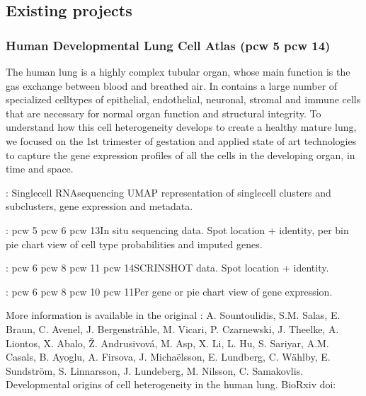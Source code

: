\documentclass[letterpaper,10pt,english,openany,oneside]{sphinxmanual}
\begin{document}
\subsection{Existing projects}
\label{\detokenize{docs/starting/projects:existing-projects}}

\subsubsection{Human Developmental Lung Cell Atlas (pcw 5\sphinxhyphen{} pcw 14)}
\label{\detokenize{docs/starting/projects:human-developmental-lung-cell-atlas-pcw-5-pcw-14}}
\sphinxAtStartPar
The human lung is a highly complex tubular organ, whose main function is the gas exchange between blood and breathed air. In contains a large number of specialized cell\sphinxhyphen{}types of epithelial, endothelial, neuronal, stromal and immune cells that are necessary for normal organ function and structural integrity. To understand how this cell heterogeneity develops to create a healthy mature lung, we focused on the 1st trimester of gestation and applied state of art technologies to capture the gene expression profiles of all the cells in the developing organ, in time and space.

\sphinxAtStartPar
{}

\sphinxAtStartPar
{}: Single\sphinxhyphen{}cell RNA\sphinxhyphen{}sequencing UMAP representation of single\sphinxhyphen{}cell clusters and sub\sphinxhyphen{}clusters, gene expression and metadata.

\sphinxAtStartPar
{}: pcw 5  pcw 6  pcw 13In situ sequencing data. Spot location + identity, per bin pie chart view of cell type probabilities and imputed genes.

\sphinxAtStartPar
{}: pcw 6  pcw 8  pcw 11  pcw 14SCRINSHOT data. Spot location + identity.

\sphinxAtStartPar
{}: pcw 6  pcw 8  pcw 10  pcw 11Per gene or pie chart view of gene expression.

\sphinxAtStartPar
More information is available in the original : A. Sountoulidis, S.M. Salas, E. Braun, C. Avenel, J. Bergenstråhle, M. Vicari, P. Czarnewski, J. Theelke, A. Liontos, X. Abalo, Ž. Andrusivová, M. Asp, X. Li, L. Hu, S. Sariyar, A.M. Casals, B. Ayoglu, A. Firsova, J. Michaëlsson, E. Lundberg, C. Wählby, E. Sundström, S. Linnarsson, J. Lundeberg, M. Nilsson, C. Samakovlis. Developmental origins of cell heterogeneity in the human lung. BioRxiv doi: 
\end{document}
